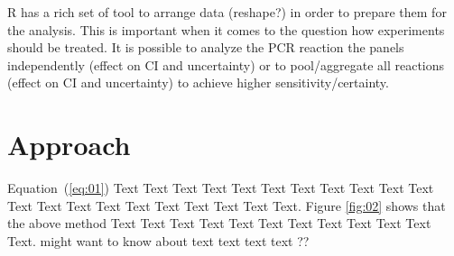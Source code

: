 \documentclass{bioinfo}
\begin{document}
R has a rich set of tool to arrange data (reshape?) in order to prepare them for 
the analysis. This is important when it comes to the question how experiments 
should be treated. It is possible to analyze the PCR reaction the panels 
independently (effect on CI and uncertainty) or to pool/aggregate all reactions 
(effect on CI and uncertainty) to achieve higher sensitivity/certainty.

\section{Approach}

Equation~(\ref{eq:01}) Text Text Text Text Text Text  Text Text Text Text Text Text Text Text Text  Text Text Text Text Text Text. Figure \ref{fig:02} shows that the above method  Text Text Text Text  Text Text Text Text Text Text  Text Text.  \citealp{Boffelli03} might want to know about  text text text text ??
\end{document}
